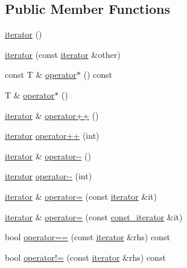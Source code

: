 \subsection*{Public Member Functions}
\begin{DoxyCompactItemize}
\item 
\hyperlink{classsc_1_1list_1_1iterator_acd90feec03d8a2762f36407a27166bb9}{iterator} ()
\item 
\hyperlink{classsc_1_1list_1_1iterator_a730c236b34c3ffc4ec7bc40879df9b50}{iterator} (const \hyperlink{classsc_1_1list_1_1iterator}{iterator} \&other)
\item 
const T \& \hyperlink{classsc_1_1list_1_1iterator_a8e1feb979567a3fa27add54563d0008f}{operator$\ast$} () const
\item 
T \& \hyperlink{classsc_1_1list_1_1iterator_a2d9470370fc14c2a37ae35e52a086a6c}{operator$\ast$} ()
\item 
\hyperlink{classsc_1_1list_1_1iterator}{iterator} \& \hyperlink{classsc_1_1list_1_1iterator_aed5c46c8e0c470a9eccb5e47d0c80f4c}{operator++} ()
\item 
\hyperlink{classsc_1_1list_1_1iterator}{iterator} \hyperlink{classsc_1_1list_1_1iterator_aa4c960f7ec3b2914da2fdbf24ae18412}{operator++} (int)
\item 
\hyperlink{classsc_1_1list_1_1iterator}{iterator} \& \hyperlink{classsc_1_1list_1_1iterator_abf189d629eae1b86654039bc923f3979}{operator-\/-\/} ()
\item 
\hyperlink{classsc_1_1list_1_1iterator}{iterator} \hyperlink{classsc_1_1list_1_1iterator_ae5780db46cc0e71abd3b8be55daddded}{operator-\/-\/} (int)
\item 
\hyperlink{classsc_1_1list_1_1iterator}{iterator} \& \hyperlink{classsc_1_1list_1_1iterator_aeb95f54e13863b315eea336de990cd62}{operator=} (const \hyperlink{classsc_1_1list_1_1iterator}{iterator} \&it)
\item 
\hyperlink{classsc_1_1list_1_1iterator}{iterator} \& \hyperlink{classsc_1_1list_1_1iterator_a66f47dc6653a1c2cf0ffe5d4014cb7db}{operator=} (const \hyperlink{classsc_1_1list_1_1const__iterator}{const\+\_\+iterator} \&it)
\item 
bool \hyperlink{classsc_1_1list_1_1iterator_a26eaacd8583e5d26a65cd6f6ef31f2bb}{operator==} (const \hyperlink{classsc_1_1list_1_1iterator}{iterator} \&rhs) const
\item 
bool \hyperlink{classsc_1_1list_1_1iterator_aa8328f0336cb54e2c2fbd3925db7e88b}{operator!=} (const \hyperlink{classsc_1_1list_1_1iterator}{iterator} \&rhs) const
\end{DoxyCompactItemize}
